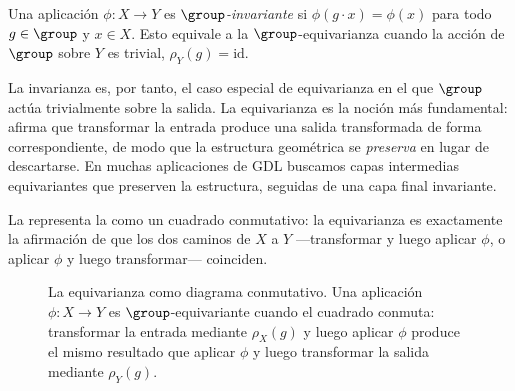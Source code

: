 \begin{definition}
\label{def:priors:invariance}
Una aplicaci\'on $\phi \colon X \to Y$ es \emph{$\group$-invariante} si
$\phi(g \cdot x) = \phi(x)$ para todo $g \in \group$ y $x \in X$. Esto equivale a
la $\group$-equivarianza cuando la acci\'on de $\group$ sobre $Y$ es trivial,
$\rho_Y(g) = \mathrm{id}$.
\end{definition}

La invarianza es, por tanto, el caso especial de equivarianza en el que $\group$
act\'ua trivialmente sobre la salida. La equivarianza es la noci\'on m\'as
fundamental: afirma que transformar la entrada produce una salida transformada de
forma correspondiente, de modo que la estructura geom\'etrica se \emph{preserva}
en lugar de descartarse. En muchas aplicaciones de GDL buscamos capas intermedias
equivariantes que preserven la estructura, seguidas de una capa final invariante.

La  representa la 
como un cuadrado conmutativo: la equivarianza es exactamente la afirmaci\'on de
que los dos caminos de $X$ a $Y$ ---transformar y luego aplicar $\phi$, o aplicar
$\phi$ y luego transformar--- coinciden.

\begin{figure}[h]
\centering
{}
\caption[El cuadrado conmutativo de la equivarianza]{La equivarianza como
diagrama conmutativo. Una aplicaci\'on $\phi \colon X \to Y$ es
$\group$-equivariante cuando el cuadrado conmuta: transformar la entrada mediante
$\rho_X(g)$ y luego aplicar $\phi$ produce el mismo resultado que aplicar $\phi$
y luego transformar la salida mediante $\rho_Y(g)$.}
\label{fig:priors:equivariance}
\end{figure}

